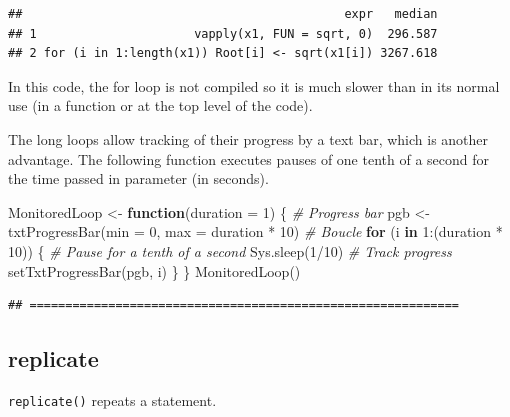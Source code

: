 \documentclass[
  12pt,
  american,
  a4paper,
  extrafontsizes,onecolumn,openright
  ]{memoir}
\newenvironment{Shaded}{\begin{snugshade}}{\end{snugshade}}
\newcommand{\AttributeTok}[1]{\textcolor[rgb]{0.77,0.63,0.00}{#1}}
\newcommand{\CommentTok}[1]{\textcolor[rgb]{0.56,0.35,0.01}{\textit{#1}}}
\newcommand{\ControlFlowTok}[1]{\textcolor[rgb]{0.13,0.29,0.53}{\textbf{#1}}}
\newcommand{\DecValTok}[1]{\textcolor[rgb]{0.00,0.00,0.81}{#1}}
\newcommand{\FunctionTok}[1]{\textcolor[rgb]{0.00,0.00,0.00}{#1}}
\newcommand{\NormalTok}[1]{#1}
\newcommand{\OtherTok}[1]{\textcolor[rgb]{0.56,0.35,0.01}{#1}}
\newcommand{\SpecialCharTok}[1]{\textcolor[rgb]{0.00,0.00,0.00}{#1}}
\begin{document}
\begin{verbatim}
##                                             expr   median
## 1                      vapply(x1, FUN = sqrt, 0)  296.587
## 2 for (i in 1:length(x1)) Root[i] <- sqrt(x1[i]) 3267.618
\end{verbatim}

\normalsize

In this code, the for loop is not compiled so it is much slower than in its normal use (in a function or at the top level of the code).

The long loops allow tracking of their progress by a text bar, which is another advantage.
The following function executes pauses of one tenth of a second for the time passed in parameter (in seconds).

\scriptsize

\begin{Shaded}
\begin{Highlighting}[]
\NormalTok{MonitoredLoop }\OtherTok{\textless{}{-}} \ControlFlowTok{function}\NormalTok{(}\AttributeTok{duration =} \DecValTok{1}\NormalTok{) \{}
    \CommentTok{\# Progress bar}
\NormalTok{    pgb }\OtherTok{\textless{}{-}} \FunctionTok{txtProgressBar}\NormalTok{(}\AttributeTok{min =} \DecValTok{0}\NormalTok{, }\AttributeTok{max =}\NormalTok{ duration }\SpecialCharTok{*} \DecValTok{10}\NormalTok{)}
    \CommentTok{\# Boucle}
    \ControlFlowTok{for}\NormalTok{ (i }\ControlFlowTok{in} \DecValTok{1}\SpecialCharTok{:}\NormalTok{(duration }\SpecialCharTok{*} \DecValTok{10}\NormalTok{)) \{}
        \CommentTok{\# Pause for a tenth of a second}
        \FunctionTok{Sys.sleep}\NormalTok{(}\DecValTok{1}\SpecialCharTok{/}\DecValTok{10}\NormalTok{)}
        \CommentTok{\# Track progress}
        \FunctionTok{setTxtProgressBar}\NormalTok{(pgb, i)}
\NormalTok{    \}}
\NormalTok{\}}
\FunctionTok{MonitoredLoop}\NormalTok{()}
\end{Highlighting}
\end{Shaded}

\begin{verbatim}
## ============================================================
\end{verbatim}

\normalsize

\hypertarget{replicate}{%
\subsection{replicate}\label{replicate}}

\texttt{replicate()} repeats a statement.
\end{document}
